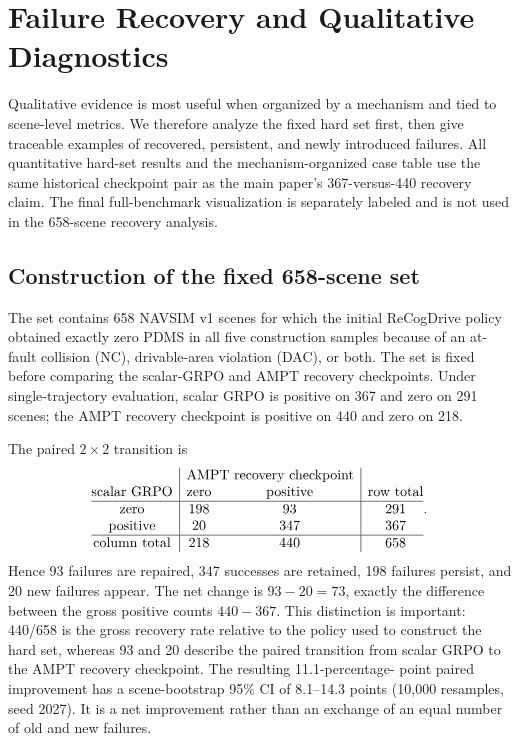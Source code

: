\section{Failure Recovery and Qualitative Diagnostics}
\label{sec:failure-qualitative}

Qualitative evidence is most useful when organized by a mechanism and tied to
scene-level metrics.  We therefore analyze the fixed hard set first, then give
traceable examples of recovered, persistent, and newly introduced failures.
All quantitative hard-set results and the mechanism-organized case table use
the same historical checkpoint pair as the main paper's 367-versus-440
recovery claim.  The final full-benchmark visualization is separately labeled
and is not used in the 658-scene recovery analysis.

\subsection{Construction of the fixed 658-scene set}
\label{sec:hard658}

The set contains 658 NAVSIM v1 scenes for which the initial ReCogDrive policy
obtained exactly zero PDMS in all five construction samples because of an
at-fault collision (NC), drivable-area violation (DAC), or both.  The set is
fixed before comparing the scalar-GRPO and AMPT recovery checkpoints.  Under
single-trajectory evaluation, scalar GRPO is positive on 367 and zero on 291
scenes; the AMPT recovery checkpoint is positive on 440 and zero on 218.

The paired $2\times2$ transition is
\begin{equation}
\begin{array}{@{}c|cc|c@{}}
 & \multicolumn{2}{c|}{\text{AMPT recovery checkpoint}} & \\
\text{scalar GRPO} & \text{zero} & \text{positive} & \text{row total} \\
\hline
\text{zero}     & 198 & 93  & 291 \\
\text{positive} & 20  & 347 & 367 \\
\hline
\text{column total} & 218 & 440 & 658
\end{array}.
\label{eq:hard658-transition}
\end{equation}
Hence 93 failures are repaired, 347 successes are retained, 198 failures
persist, and 20 new failures appear.  The net change is $93-20=73$, exactly the
difference between the gross positive counts $440-367$.  This distinction is
important: 440/658 is the gross recovery rate relative to the policy used to
construct the hard set, whereas 93 and 20 describe the paired transition from
scalar GRPO to the AMPT recovery checkpoint.  The resulting 11.1-percentage-
point paired improvement has a scene-bootstrap 95\% CI of 8.1--14.3 points
(10,000 resamples, seed 2027).  It is a net improvement rather than an exchange
of an equal number of old and new failures.

